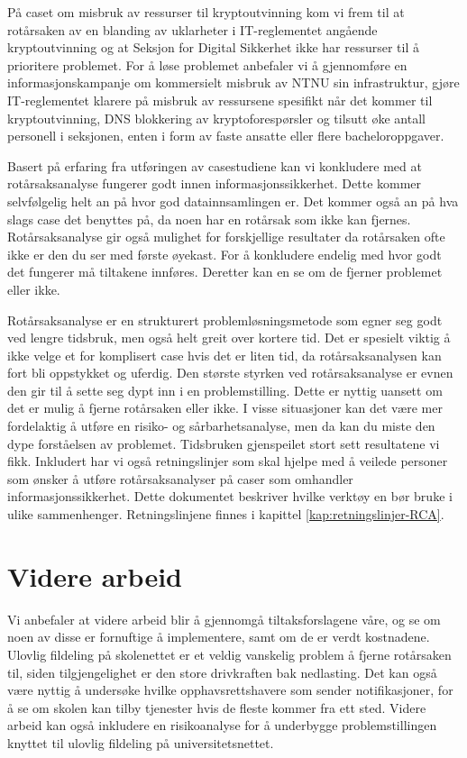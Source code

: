 \noindent På caset om misbruk av ressurser til kryptoutvinning kom vi frem til at rotårsaken av en blanding av uklarheter i IT-reglementet angående kryptoutvinning og at Seksjon for Digital Sikkerhet ikke har ressurser til å prioritere problemet. For å løse problemet anbefaler vi å gjennomføre en informasjonskampanje om kommersielt misbruk av NTNU sin infrastruktur, gjøre IT-reglementet klarere på misbruk av ressursene spesifikt når det kommer til kryptoutvinning, DNS blokkering av kryptoforespørsler og tilsutt øke antall personell i seksjonen, enten i form av faste ansatte eller flere bacheloroppgaver. 
\newline

\noindent Basert på erfaring fra utføringen av casestudiene kan vi konkludere med at rotårsaksanalyse fungerer godt innen informasjonssikkerhet. Dette kommer selvfølgelig helt an på hvor god datainnsamlingen er. Det kommer også an på hva slags case det benyttes på, da noen har en rotårsak som ikke kan fjernes. Rotårsaksanalyse gir også mulighet for forskjellige resultater da rotårsaken ofte ikke er den du ser med første øyekast. For å konkludere endelig med hvor godt det fungerer må tiltakene innføres. Deretter kan en se om de fjerner problemet eller ikke. 
\newline

\noindent Rotårsaksanalyse er en strukturert problemløsningsmetode som egner seg godt ved lengre tidsbruk, men også helt greit over kortere tid. Det er spesielt viktig å ikke velge et for komplisert case hvis det er liten tid, da rotårsaksanalysen kan fort bli oppstykket og uferdig. Den største styrken ved rotårsaksanalyse er evnen den gir til å sette seg dypt inn i en problemstilling. Dette er nyttig uansett om det er mulig å fjerne rotårsaken eller ikke. I visse situasjoner kan det være mer fordelaktig å utføre en risiko- og sårbarhetsanalyse, men da kan du miste den dype forståelsen av problemet. Tidsbruken gjenspeilet stort sett resultatene vi fikk. Inkludert har vi også retningslinjer som skal hjelpe med å veilede personer som ønsker å utføre rotårsaksanalyser på caser som omhandler informasjonssikkerhet. Dette dokumentet beskriver hvilke verktøy en bør bruke i ulike sammenhenger. Retningslinjene finnes i kapittel \ref{kap:retningslinjer-RCA}. 

\section{Videre arbeid}
Vi anbefaler at videre arbeid blir å gjennomgå tiltaksforslagene våre, og se om noen av disse er fornuftige å implementere, samt om de er verdt kostnadene. Ulovlig fildeling på skolenettet er et veldig vanskelig problem å fjerne rotårsaken til, siden tilgjengelighet er den store drivkraften bak nedlasting. Det kan også være nyttig å undersøke hvilke opphavsrettshavere som sender notifikasjoner, for å se om skolen kan tilby tjenester hvis de fleste kommer fra ett sted. Videre arbeid kan også inkludere en risikoanalyse for å underbygge problemstillingen knyttet til ulovlig fildeling på universitetsnettet. 

